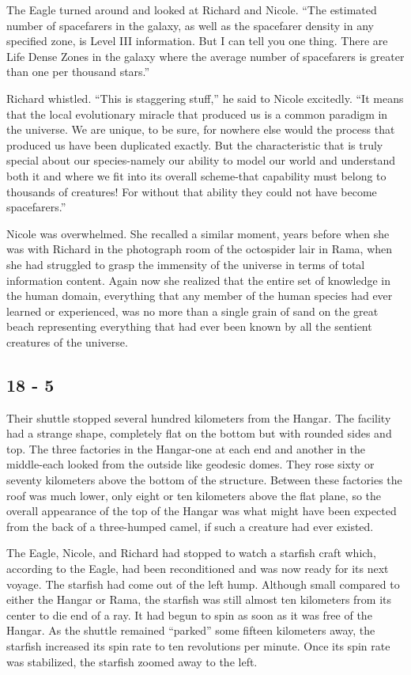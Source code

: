 \documentclass[]{article}
\begin{document}
{The Eagle turned around and looked at Richard and Nicole. “The estimated number of spacefarers in the galaxy, as well as the spacefarer density in any specified zone, is Level III information. But I can tell you one thing. There are Life Dense Zones in the galaxy where the average number of spacefarers is greater than one per thousand stars.”

Richard whistled. “This is staggering stuff,” he said to Nicole excitedly. “It means that the local evolutionary miracle that produced us is a common paradigm in the universe. We are unique, to be sure, for nowhere else would the process that produced us have been duplicated exactly. But the characteristic that is truly special about our species-namely our ability to model our world and understand both it and where we fit into its overall scheme-that capability must belong to thousands of creatures! For without that ability they could not have become spacefarers.”

Nicole was overwhelmed. She recalled a similar moment, years before when she was with Richard in the photograph room of the octospider lair in Rama, when she had struggled to grasp the immensity of the universe in terms of total information content. Again now she realized that the entire set of knowledge in the human domain, everything that any member of the human species had ever learned or experienced, was no more than a single grain of sand on the great beach representing everything that had ever been known by all the sentient creatures of the universe.

\subsection{18 - 5}

Their shuttle stopped several hundred kilometers from the Hangar. The facility had a strange shape, completely flat on the bottom but with rounded sides and top. The three factories in the Hangar-one at each end and another in the middle-each looked from the outside like geodesic domes. They rose sixty or seventy kilometers above the bottom of the structure. Between these factories the roof was much lower, only eight or ten kilometers above the flat plane, so the overall appearance of the top of the Hangar was what might have been expected from the back of a three-humped camel, if such a creature had ever existed.

The Eagle, Nicole, and Richard had stopped to watch a starfish craft which, according to the Eagle, had been reconditioned and was now ready for its next voyage. The starfish had come out of the left hump. Although small compared to either the Hangar or Rama, the starfish was still almost ten kilometers from its center to die end of a ray. It had begun to spin as soon as it was free of the Hangar. As the shuttle remained “parked” some fifteen kilometers away, the starfish increased its spin rate to ten revolutions per minute. Once its spin rate was stabilized, the starfish zoomed away to the left.

}
\end{document}
